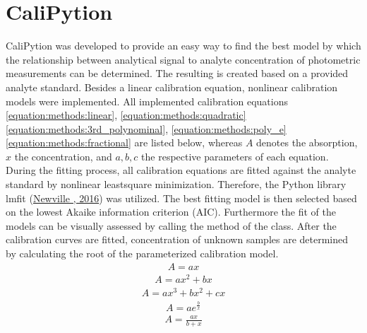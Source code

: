\documentclass[letterpaper,12pt,english]{jupyterBook}
\begin{document}
\section{CaliPytion}
\label{\detokenize{methods:calipytion}}
\sphinxAtStartPar
CaliPytion was developed to provide an easy way to find the best model by which the relationship between analytical signal to analyte concentration of photometric measurements can be determined. The resulting  is created based on a provided analyte standard. Besides a linear calibration equation, non\sphinxhyphen{}linear calibration models were implemented. All implemented calibration equations \eqref{equation:methods:linear}, \eqref{equation:methods:quadratic} \eqref{equation:methods:3rd_polynominal}, \eqref{equation:methods:poly_e} \eqref{equation:methods:fractional} are listed below, whereas \(A\) denotes the absorption, \(x\) the concentration, and \(a, b, c\) the respective parameters of each equation.
During the fitting process, all calibration equations are fitted against the analyte standard by non\sphinxhyphen{}linear least\sphinxhyphen{}square minimization. Therefore, the Python library lmfit (\hyperlink{cite.references:id35}{Newville , 2016}) was utilized. The best fitting model is then selected based on the lowest Akaike information criterion (AIC). Furthermore the fit of the models can be visually assessed by calling the  method of the  class. After the calibration curves are fitted, concentration of unknown samples are determined by calculating the root of the parameterized calibration model.
\begin{equation}\label{equation:methods:linear}
\begin{split}A = ax\end{split}
\end{equation}\begin{equation}\label{equation:methods:quadratic}
\begin{split}A = ax^2 + bx\end{split}
\end{equation}\begin{equation}\label{equation:methods:3rd_polynominal}
\begin{split}A = ax^3 + bx^2 + cx\end{split}
\end{equation}\begin{equation}\label{equation:methods:poly_e}
\begin{split}A = ae^{\frac{b}{x}}\end{split}
\end{equation}\begin{equation}\label{equation:methods:fractional}
\begin{split}A = \frac{ax}{b+x}\end{split}
\end{equation}
\end{document}
